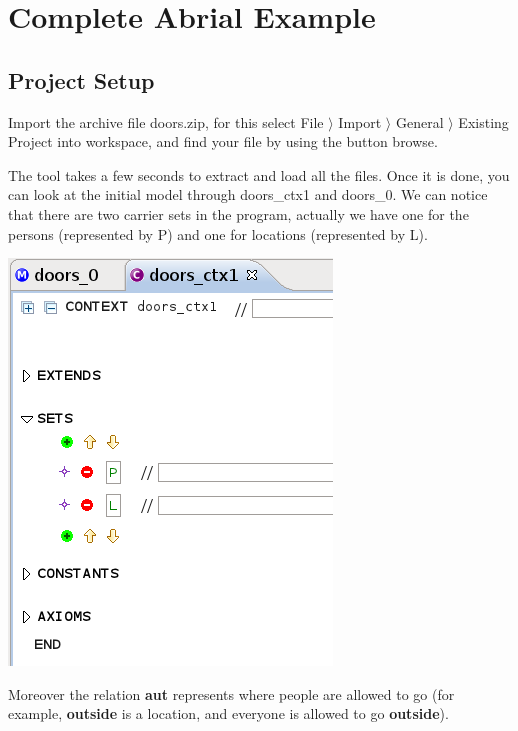 \section{Complete Abrial Example}
\label{tutorial_10}


\subsection{Project Setup}
Import the archive file doors.zip, for this select  \textsf{File $\rangle$ Import $\rangle$ General $\rangle$ Existing Project into workspace}, and find your file by using the button browse.

The tool takes a few seconds to extract and load all the files. Once it is done, you can look at the initial model through doors\_ctx1 and doors\_0.
We can notice that there are two carrier sets in the program, actually we have one for the persons (represented by P) and one for locations (represented by L).
\begin{center}
	\includegraphics[]{img/tutorial/tut_10_carrier-sets.png}
\end{center}
Moreover the relation \textbf{aut} represents where people are allowed to go (for example, \textbf{outside} is a location, and everyone is allowed to go \textbf{outside}).

